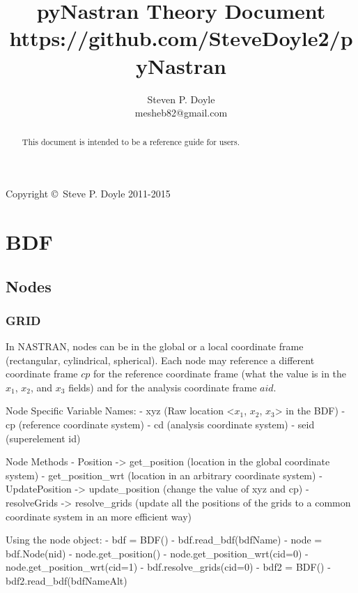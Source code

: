 
\title{pyNastran Theory Document \\
\small https://github.com/SteveDoyle2/pyNastran }
\author{Steven P. Doyle\\
{\small mesheb82@gmail.com}
}

\maketitle

\begin{abstract}
This document is intended to be a reference guide for users.
\end{abstract}

Copyright \copyright\ Steve P. Doyle 2011-2015
\newpage

\tableofcontents
\newpage

\section{BDF}

 \subsection{Nodes}
  \subsubsection{GRID}
     In NASTRAN, nodes can be in the global or a local coordinate
     frame (rectangular, cylindrical, spherical).  Each node may reference
     a different coordinate frame $cp$ for the reference coordinate frame
     (what the value is in the $x_1$, $x_2$, and $x_3$ fields) and for the
     analysis coordinate frame $aid$.
     
     Node Specific Variable Names:
      - xyz (Raw location <$x_1$, $x_2$, $x_3$> in the BDF)
      - cp (reference coordinate system)
      - cd (analysis  coordinate system)
      - seid (superelement id)

     Node Methods
      - Position -> get_position (location in the global coordinate system)
      - get_position_wrt  (location in an arbitrary coordinate system)
      - UpdatePosition -> update_position (change the value of xyz and cp)
      - resolveGrids -> resolve_grids (update all the positions of the grids to a common coordinate system in an more efficient way)

     Using the node object:
      - bdf = BDF()
      - bdf.read_bdf(bdfName)
      - node = bdf.Node(nid)
      - node.get_position()            %
      - node.get_position_wrt(cid=0)   %
      - node.get_position_wrt(cid=1)   %
      - bdf.resolve_grids(cid=0) %
      - bdf2 = BDF()
      - bdf2.read_bdf(bdfNameAlt)

